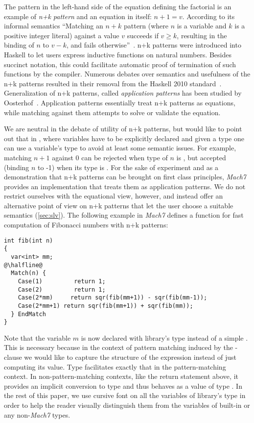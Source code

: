 \noindent
The  pattern in the left-hand side of the equation defining 
the factorial is an example of \emph{n+k pattern} and an equation in itself: 
$n+1=v$. According to its informal semantics ``Matching an $n+k$ pattern (where 
$n$ is a variable and $k$ is a positive integer literal) against a value $v$ 
succeeds if $v \ge k$, resulting in the binding of $n$ to $v-k$, and fails 
otherwise''~\cite{haskell98}. n+k patterns were introduced into Haskell to let 
users express inductive functions on natural numbers. Besides succinct notation, 
this could facilitate automatic proof of termination of such functions by the 
compiler. Numerous debates over semantics and usefulness of the n+k patterns 
resulted in their removal from the Haskell 2010 standard~\cite{haskell2010}. 
Generalization of n+k patterns, called \emph{application patterns} has been 
studied by Oosterhof~\cite{OosterhofThesis}. Application patterns essentially 
treat n+k patterns as equations, while matching against them attempts to solve 
or validate the equation.

We are neutral in the debate of utility of n+k patterns, but would like to point 
out that in \Cpp{}, where variables have to be explicitly declared and given a 
type one can use a variable's type to avoid at least some semantic issues. For 
example, matching $n+1$ against 0 can be rejected when type of $n$ is 
, but accepted (binding $n$ to -1) when its type is 
. For the sake of experiment and as a demonstration that n+k patterns 
can be brought on first class principles, \emph{Mach7} provides an 
implementation that treats them as application patterns. We do not restrict 
ourselves with the equational view, however, and instead offer an alternative 
point of view on n+k patterns that let the user choose a suitable semantics 
(\textsection\ref{sec:slv}). The following example in \emph{Mach7} defines a 
function for fast computation of Fibonacci numbers with n+k patterns:

\begin{lstlisting}[keepspaces]
int fib(int n)
{
  var<int> mm;
@\halfline@
  Match(n) {
    Case(1)         return 1;     
    Case(2)         return 1;
    Case(2*mm)     return sqr(fib(mm+1)) - sqr(fib(mm-1));
    Case(2*mm+1) return sqr(fib(mm+1)) + sqr(fib(mm));
  } EndMatch
}
\end{lstlisting}

\noindent
Note that the variable $m$ is now declared with library's type  
instead of a simple . This is necessary because in the context of 
pattern matching induced by the -clause we would like to capture the 
structure of the expression  instead of just computing its value. 
Type  facilitates exactly that in the pattern-matching context. In 
non-pattern-matching contexts, like the return statement above, it provides an 
implicit conversion to type  and thus behaves as a value of type . 
In the rest of this paper, we use cursive font on all the variables of 
library's type in order to help the reader visually distinguish them from the 
variables of built-in or any non-\emph{Mach7} types.

